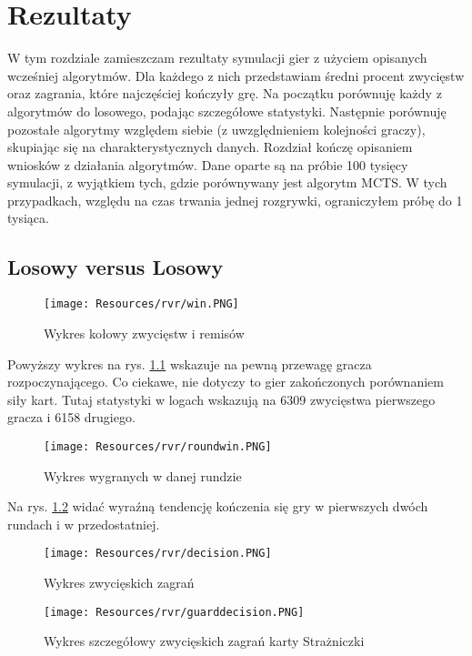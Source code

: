 \chapter{Rezultaty}
\label{cha:rozdz5}

W tym rozdziale zamieszczam rezultaty symulacji gier z użyciem opisanych wcześniej algorytmów. Dla każdego z nich przedstawiam średni procent zwycięstw oraz zagrania, które najczęściej kończyły grę. Na początku porównuję każdy z algorytmów do losowego, podając szczegółowe statystyki. Następnie porównuję pozostałe algorytmy względem siebie (z uwzględnieniem kolejności graczy), skupiając się na charakterystycznych danych. Rozdział kończę opisaniem wniosków z działania algorytmów. Dane oparte są na próbie 100 tysięcy symulacji, z wyjątkiem tych, gdzie porównywany jest algorytm MCTS. W tych przypadkach, względu na czas trwania jednej rozgrywki, ograniczyłem próbę do 1 tysiąca.


\section{Losowy versus Losowy}

\begin{figure}[H]
	\centering
	\texttt{[image: Resources/rvr/win.PNG]}
	\caption{Wykres kołowy zwycięstw i remisów} 
	\label{fig:rvrwin}
\end{figure}

Powyższy wykres na rys. \ref{fig:rvrwin} wskazuje na pewną przewagę gracza rozpoczynającego. Co ciekawe, nie dotyczy to gier zakończonych porównaniem siły kart. Tutaj statystyki w logach wskazują na 6309 zwycięstwa pierwszego gracza i 6158 drugiego.

\begin{figure}[H]
	\centering
	\texttt{[image: Resources/rvr/roundwin.PNG]}
	\caption{Wykres wygranych w danej rundzie} 
	\label{fig:rvrroundwin}
\end{figure}

Na rys. \ref{fig:rvrroundwin} widać wyraźną tendencję kończenia się gry w pierwszych dwóch rundach i w przedostatniej. 

\clearpage
\begin{figure}[H]
	\centering
	\texttt{[image: Resources/rvr/decision.PNG]}
	\caption{Wykres zwycięskich zagrań} 
	\label{fig:rvrdecision}
\end{figure} 

\begin{figure}[H]
	\centering
	\texttt{[image: Resources/rvr/guarddecision.PNG]}
	\caption{Wykres szczegółowy zwycięskich zagrań karty Strażniczki} 
	\label{fig:rvrguarddecision}
\end{figure}

